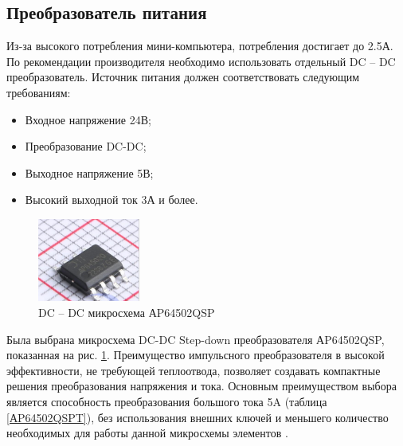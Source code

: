 \subsection{Преобразователь питания}
Из-за высокого потребления мини-компьютера, потребления достигает до 2.5А. По рекомендации производителя необходимо использовать отдельный DC – DC преобразователь. Источник питания должен соответствовать следующим требованиям:
\begin{itemize}
	\item Входное напряжение 24В;
	\item Преобразование DC-DC;
	\item Выходное напряжение 5В;
	\item Высокий выходной ток 3А и более.
\end{itemize}
\begin{figure}[H]
	\centering
	\includegraphics[width=0.3\textwidth]{Src/images/dc-dc.png}
	\caption{DC – DC микросхема АP64502QSP}
	\label{АP64502QSP}
\end{figure}
Была выбрана микросхема DC-DC Step-down преобразователя АP64502QSP, показанная на рис. \ref{АP64502QSP}. Преимущество импульсного преобразователя в высокой эффективности, не требующей теплоотвода, позволяет создавать компактные решения преобразования напряжения и тока.
Основным преимуществом выбора является способность преобразования большого тока 5A (таблица \ref{АP64502QSPT}), без использования внешних ключей и меньшего количество необходимых для работы данной микросхемы элементов \citep{AP64502Q}.



